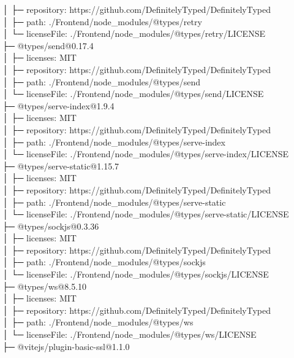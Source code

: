 │  ├─ repository: https://github.com/DefinitelyTyped/DefinitelyTyped\\
│  ├─ path: ./Frontend/node\_modules/@types/retry\\
│  └─ licenseFile: ./Frontend/node\_modules/@types/retry/LICENSE\\
├─ @types/send@0.17.4\\
│  ├─ licenses: MIT\\
│  ├─ repository: https://github.com/DefinitelyTyped/DefinitelyTyped\\
│  ├─ path: ./Frontend/node\_modules/@types/send\\
│  └─ licenseFile: ./Frontend/node\_modules/@types/send/LICENSE\\
├─ @types/serve-index@1.9.4\\
│  ├─ licenses: MIT\\
│  ├─ repository: https://github.com/DefinitelyTyped/DefinitelyTyped\\
│  ├─ path: ./Frontend/node\_modules/@types/serve-index\\
│  └─ licenseFile: ./Frontend/node\_modules/@types/serve-index/LICENSE\\
├─ @types/serve-static@1.15.7\\
│  ├─ licenses: MIT\\
│  ├─ repository: https://github.com/DefinitelyTyped/DefinitelyTyped\\
│  ├─ path: ./Frontend/node\_modules/@types/serve-static\\
│  └─ licenseFile: ./Frontend/node\_modules/@types/serve-static/LICENSE\\
├─ @types/sockjs@0.3.36\\
│  ├─ licenses: MIT\\
│  ├─ repository: https://github.com/DefinitelyTyped/DefinitelyTyped\\
│  ├─ path: ./Frontend/node\_modules/@types/sockjs\\
│  └─ licenseFile: ./Frontend/node\_modules/@types/sockjs/LICENSE\\
├─ @types/ws@8.5.10\\
│  ├─ licenses: MIT\\
│  ├─ repository: https://github.com/DefinitelyTyped/DefinitelyTyped\\
│  ├─ path: ./Frontend/node\_modules/@types/ws\\
│  └─ licenseFile: ./Frontend/node\_modules/@types/ws/LICENSE\\
├─ @vitejs/plugin-basic-ssl@1.1.0\\
